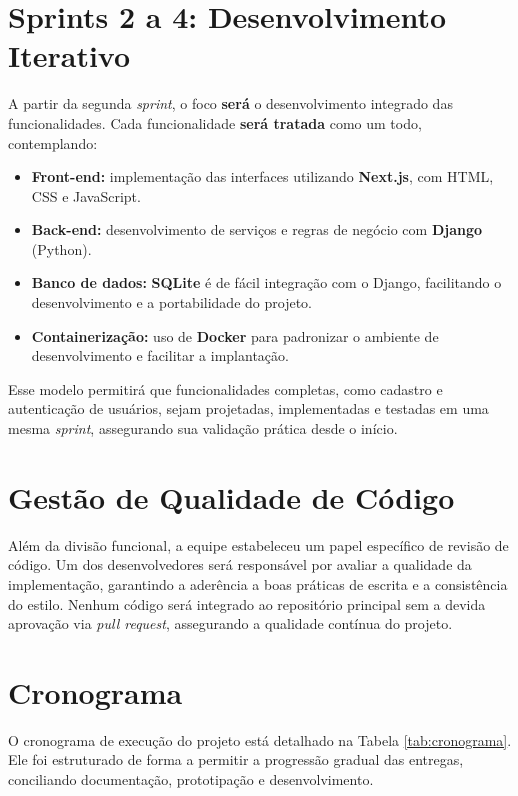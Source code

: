 \section{Sprints 2 a 4: Desenvolvimento Iterativo}

A partir da segunda \textit{sprint}, o foco \textbf{será} o desenvolvimento integrado das funcionalidades. Cada funcionalidade \textbf{será tratada} como um todo, contemplando:

\begin{itemize}
    \item \textbf{Front-end:} implementação das interfaces utilizando \textbf{Next.js}, com HTML, CSS e JavaScript.
    \item \textbf{Back-end:} desenvolvimento de serviços e regras de negócio com \textbf{Django} (Python).
    \item \textbf{Banco de dados:} \textbf{SQLite} é de fácil integração com o Django, facilitando o desenvolvimento e a portabilidade do projeto.
    \item \textbf{Containerização:} uso de \textbf{Docker} para padronizar o ambiente de desenvolvimento e facilitar a implantação.
\end{itemize}

Esse modelo permitirá que funcionalidades completas, como cadastro e autenticação de usuários, sejam projetadas, implementadas e testadas em uma mesma \textit{sprint}, assegurando sua validação prática desde o início.

\section{Gestão de Qualidade de Código}

Além da divisão funcional, a equipe estabeleceu um papel específico de revisão de código. Um dos desenvolvedores será responsável por avaliar a qualidade da implementação, garantindo a aderência a boas práticas de escrita e a consistência do estilo. Nenhum código será integrado ao repositório principal sem a devida aprovação via \textit{pull request}, assegurando a qualidade contínua do projeto.

\section{Cronograma}

O cronograma de execução do projeto está detalhado na Tabela \ref{tab:cronograma}. Ele foi estruturado de forma a permitir a progressão gradual das entregas, conciliando documentação, prototipação e desenvolvimento.

